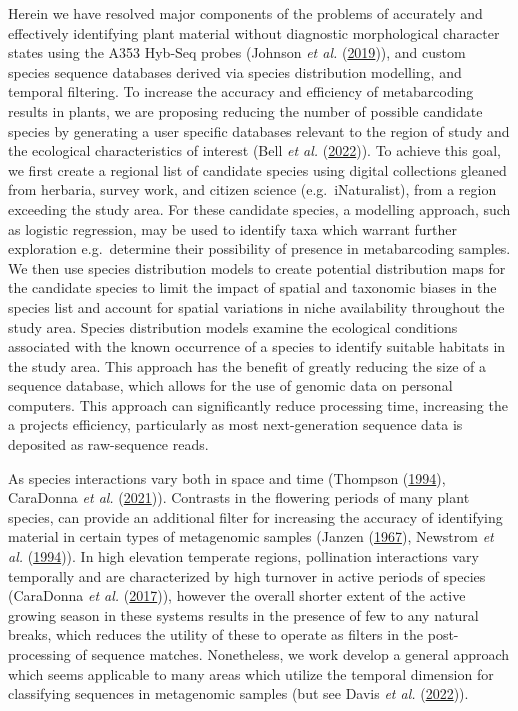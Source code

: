 \documentclass[
]{article}
\begin{document}
Herein we have resolved major components of the problems of accurately
and effectively identifying plant material without diagnostic
morphological character states using the A353 Hyb-Seq probes (Johnson
\emph{et al.} (\protect\hyperlink{ref-johnson2019universal}{2019})), and
custom species sequence databases derived via species distribution
modelling, and temporal filtering. To increase the accuracy and
efficiency of metabarcoding results in plants, we are proposing reducing
the number of possible candidate species by generating a user specific
databases relevant to the region of study and the ecological
characteristics of interest (Bell \emph{et al.}
(\protect\hyperlink{ref-bell2022plants}{2022})). To achieve this goal,
we first create a regional list of candidate species using digital
collections gleaned from herbaria, survey work, and citizen science
(e.g.~iNaturalist), from a region exceeding the study area. For these
candidate species, a modelling approach, such as logistic regression,
may be used to identify taxa which warrant further exploration
e.g.~determine their possibility of presence in metabarcoding samples.
We then use species distribution models to create potential distribution
maps for the candidate species to limit the impact of spatial and
taxonomic biases in the species list and account for spatial variations
in niche availability throughout the study area. Species distribution
models examine the ecological conditions associated with the known
occurrence of a species to identify suitable habitats in the study area.
This approach has the benefit of greatly reducing the size of a sequence
database, which allows for the use of genomic data on personal
computers. This approach can significantly reduce processing time,
increasing the a projects efficiency, particularly as most
next-generation sequence data is deposited as raw-sequence reads.

As species interactions vary both in space and time (Thompson
(\protect\hyperlink{ref-thompson1994coevolutionary}{1994}), CaraDonna
\emph{et al.} (\protect\hyperlink{ref-caradonna2021seeing}{2021})).
Contrasts in the flowering periods of many plant species, can provide an
additional filter for increasing the accuracy of identifying material in
certain types of metagenomic samples (Janzen
(\protect\hyperlink{ref-janzen1967synchronization}{1967}), Newstrom
\emph{et al.} (\protect\hyperlink{ref-Newstrom1994ANC}{1994})). In high
elevation temperate regions, pollination interactions vary temporally
and are characterized by high turnover in active periods of species
(CaraDonna \emph{et al.}
(\protect\hyperlink{ref-caradonna2017interaction}{2017})), however the
overall shorter extent of the active growing season in these systems
results in the presence of few to any natural breaks, which reduces the
utility of these to operate as filters in the post-processing of
sequence matches. Nonetheless, we work develop a general approach which
seems applicable to many areas which utilize the temporal dimension for
classifying sequences in metagenomic samples (but see Davis \emph{et
al.} (\protect\hyperlink{ref-davis2022new}{2022})).
\end{document}
